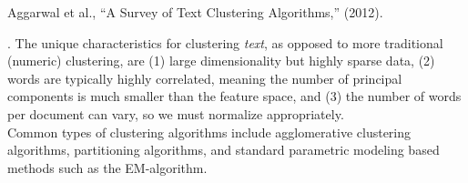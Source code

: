 \documentclass[11pt]{article}
\newcommand\p{\Needspace{10\baselineskip} \noindent}
\begin{document}
\vspace{-1em}
{\footnotesize Aggarwal et al., ``A Survey of Text Clustering Algorithms,'' (2012).}

\p {}. The unique characteristics for clustering \textit{text}, as opposed to more traditional (numeric) clustering, are (1) large dimensionality but highly sparse data, (2) words are typically highly correlated, meaning the number of principal components is much smaller than the feature space, and (3) the number of words per document can vary, so we must normalize appropriately.\\

\p Common types of clustering algorithms include agglomerative clustering algorithms, partitioning algorithms, and standard parametric modeling based methods such as the EM-algorithm.
\end{document}
